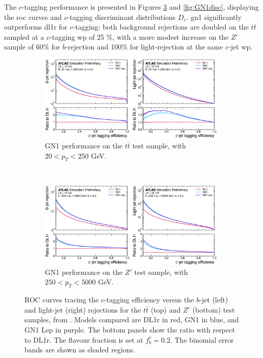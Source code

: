 The $c$-tagging performance is presented in Figures \ref{fig:GN1rocc} and \ref{fig:GN1disc}, displaying the \gls{roc} curves and $c$-tagging discriminant distributions $D_c$. \gls{gn1} significantly outperforms \gls{dl1r} for $c$-tagging: both background rejections are doubled on the $t\bar{t}$ sampled at a $c$-tagging \gls{wp} of 25 \%, with a more modest increase on the $Z'$ sample of 60\% for $b$-rejection and 100\% for light-rejection at the same $c$-jet \gls{wp}.

\begin{figure}[h!]
  \centering
  \begin{subfigure}[b]{0.98\textwidth}
      \centering
      \includegraphics[width=0.98\textwidth]{Images/FTAG/GN/GN1/ROC/ttc.png}
      \caption{GN1 performance on the $t\bar{t}$ test sample, with $20 < p_T < 250$ GeV.} 
      \label{fig:GN1ttc}
  \end{subfigure}\\
  \begin{subfigure}[b]{0.98\textwidth}
    \centering %
      \includegraphics[width=0.98\textwidth]{Images/FTAG/GN/GN1/ROC/zpc.png}
      \caption{GN1 performance on the $Z'$ test sample, with $250 < p_T < 5000$ GeV.} 
      \label{fig:GN1zpc}
  \end{subfigure}
  \caption{ROC curves tracing the $c$-tagging efficiency versus the $b$-jet (left) and light-jet (right) rejections for the $t\bar{t}$ (top) and $Z'$ (bottom) test samples, from \cite{ATL-PHYS-PUB-2022-027}. Models compared are DL1r in red, GN1 in blue, and GN1 Lep in purple. The bottom panels show the ratio with respect to DL1r. The flavour fraction is set at $f^c_b = 0.2$. The binomial error bands are shown as shaded regions.}
  \label{fig:GN1rocc}
\end{figure} 

